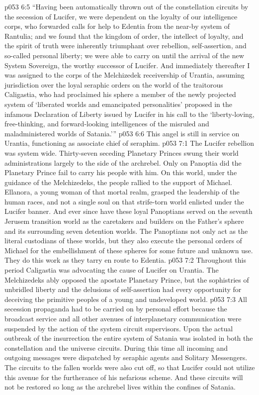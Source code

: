 \vs p053 6:5 “Having been automatically thrown out of the constellation circuits by the secession of Lucifer, we were dependent on the loyalty of our intelligence corps, who forwarded calls for help to Edentia from the near\hyp{}by system of Rantulia; and we found that the kingdom of order, the intellect of loyalty, and the spirit of truth were inherently triumphant over rebellion, self\hyp{}assertion, and so\hyp{}called personal liberty; we were able to carry on until the arrival of the new System Sovereign, the worthy successor of Lucifer. And immediately thereafter I was assigned to the corps of the Melchizedek receivership of Urantia, assuming jurisdiction over the loyal seraphic orders on the world of the traitorous Caligastia, who had proclaimed his sphere a member of the newly projected system of ‘liberated worlds and emancipated personalities’ proposed in the infamous Declaration of Liberty issued by Lucifer in his call to the ‘liberty\hyp{}loving, free\hyp{}thinking, and forward\hyp{}looking intelligences of the misruled and maladministered worlds of Satania.’”
\vs p053 6:6 \pc This angel is still in service on Urantia, functioning as associate chief of seraphim.
\vs p053 7:1 The Lucifer rebellion was system wide. Thirty\hyp{}seven seceding Planetary Princes swung their world administrations largely to the side of the archrebel. Only on Panoptia did the Planetary Prince fail to carry his people with him. On this world, under the guidance of the Melchizedeks, the people rallied to the support of Michael. Ellanora, a young woman of that mortal realm, grasped the leadership of the human races, and not a single soul on that strife\hyp{}torn world enlisted under the Lucifer banner. And ever since have these loyal Panoptians served on the seventh Jerusem transition world as the caretakers and builders on the Father’s sphere and its surrounding seven detention worlds. The Panoptians not only act as the literal custodians of these worlds, but they also execute the personal orders of Michael for the embellishment of these spheres for some future and unknown use. They do this work as they tarry en route to Edentia.
\vs p053 7:2 Throughout this period Caligastia was advocating the cause of Lucifer on Urantia. The Melchizedeks ably opposed the apostate Planetary Prince, but the sophistries of unbridled liberty and the delusions of self\hyp{}assertion had every opportunity for deceiving the primitive peoples of a young and undeveloped world.
\vs p053 7:3 All secession propaganda had to be carried on by personal effort because the broadcast service and all other avenues of interplanetary communication were suspended by the action of the system circuit supervisors. Upon the actual outbreak of the insurrection the entire system of Satania was isolated in both the constellation and the universe circuits. During this time all incoming and outgoing messages were dispatched by seraphic agents and Solitary Messengers. The circuits to the fallen worlds were also cut off, so that Lucifer could not utilize this avenue for the furtherance of his nefarious scheme. And these circuits will not be restored so long as the archrebel lives within the confines of Satania.
